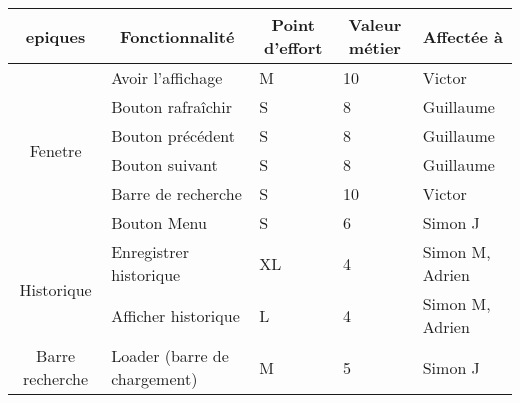 \documentclass[10pt,a4paper]{article}
\begin{document}
\begin{table}[h]
\begin{tabular}{|c|l|l|l|l|}
\hline
\textbf{epiques}               & \multicolumn{1}{c|}{\textbf{Fonctionnalité}} & \multicolumn{1}{c|}{\textbf{Point d'effort}} & \multicolumn{1}{c|}{\textbf{Valeur métier}} & \textbf{Affectée à} \\ \hline
\multirow{6}{*}{Fenetre}    & Avoir l'affichage                            & M                                            & 10                                          & Victor              \\ \cline{2-5} 
                            & Bouton rafraîchir                            & S                                            & 8                                           & Guillaume           \\ \cline{2-5} 
                            & Bouton précédent                             & S                                            & 8                                           & Guillaume           \\ \cline{2-5} 
                            & Bouton suivant                               & S                                            & 8                                           & Guillaume           \\ \cline{2-5} 
                            & Barre de recherche                           & S                                            & 10                                          & Victor              \\ \cline{2-5} 
                            & Bouton Menu                                  & S                                            & 6                                           & Simon J             \\ \hline
\multirow{2}{*}{Historique} & Enregistrer historique                       & XL                                           & 4                                           & Simon M, Adrien     \\ \cline{2-5} 
                            & Afficher historique                          & L                                            & 4                                           & Simon M, Adrien     \\ \hline
Barre recherche             & Loader (barre de chargement)                 & M                                            & 5                                           & Simon J             \\ \hline
\end{tabular}
\end{table}
\end{document}
